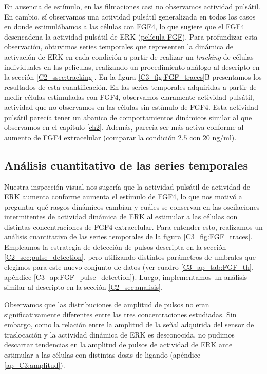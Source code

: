 \documentclass[./main.tex]{subfiles}
\begin{document}
En ausencia de estímulo, en las filmaciones casi no observamos actividad pulsátil. En cambio, sí observamos una actividad pulsátil generalizada en todos los casos en donde estimulábamos a las células con FGF4, lo que sugiere que el FGF4 desencadena la actividad pulsátil de ERK (\href{http://movie.biologists.com/video/10.1242/dev.199710/video-2}{\underline{película FGF}}). Para profundizar esta observación, obtuvimos series temporales que representen la dinámica de activación de ERK en cada condición a partir de realizar un \textit{tracking} de células individuales en las películas, realizando un procedimiento análogo al descripto en la sección \ref{C2_ssec:tracking}. En la figura \ref{C3_fig:FGF_traces}B presentamos los resultados de esta cuantificación. En las series temporales adquiridas a partir de medir células estimuladas con FGF4, observamos claramente actividad pulsátil, actividad que no observamos en las células sin estímulo de FGF4. Esta actividad pulsátil parecía tener un abanico de comportamientos dinámicos similar al que observamos en el capítulo \ref{ch2}. Además, parecía ser más activa conforme al aumento de FGF4 extracelular (comparar la condición $2.5$ con $20$ ng/ml). 


\subsection{Análisis cuantitativo de las series temporales}
\label{C3_ssec:analisis_cuantitativo}

Nuestra inspección visual nos sugería que la actividad pulsátil de actividad de ERK aumenta conforme aumenta el estímulo de FGF4, lo que nos motivó a preguntar qué rasgos dinámicos cambian y cuáles se conservan en las oscilaciones intermitentes de actividad dinámica de ERK al estimular a las células con distintas concentraciones de FGF4 extracelular. Para entender esto, realizamos un análisis cuantitativo de las series temporales de la figura \ref{C3_fig:FGF_traces}. Empleamos la estrategia de detección de pulsos descripta en la sección \ref{C2_sec:pulse_detection}, pero utilizando distintos parámetros de umbrales que elegimos para este nuevo conjunto de datos (ver cuadro \ref{C3_ap_tab:FGF_th}, apéndice \ref{C3_ap:FGF_pulse_detection}). Luego, implementamos un análisis similar al descripto en la sección \ref{C2_sec:analisis}. 

Observamos que las distribuciones de amplitud de pulsos no eran significativamente diferentes entre las tres concentraciones estudiadas. Sin embargo, como la relación entre la amplitud de la señal adquirida del sensor de traslocación y la actividad dinámica de ERK es desconocida, no pudimos descartar tendencias en la amplitud de pulsos de actividad de ERK ante estimular a las células con  distintas dosis de ligando (apéndice \ref{ap_C3:amplitud}). 
\end{document}

